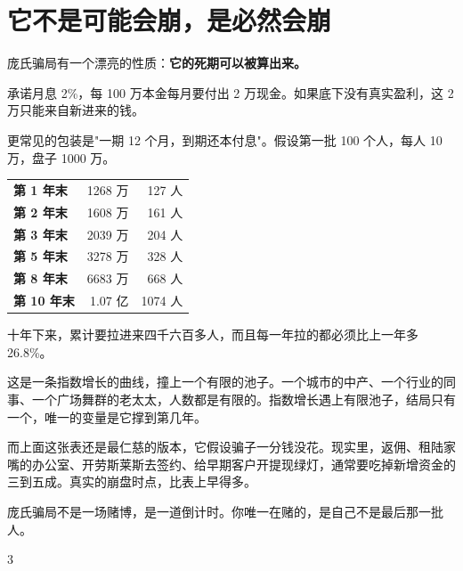 \section{它不是可能会崩，是必然会崩}

庞氏骗局有一个漂亮的性质：\textbf{它的死期可以被算出来。}

承诺月息 2\%，每 100 万本金每月要付出 2 万现金。如果底下没有真实盈利，这 2 万只能来自新进来的钱。

更常见的包装是"一期 12 个月，到期还本付息"。假设第一批 100 个人，每人 10 万，盘子 1000 万。

\begin{tablewrap}
\begin{xltabular}{\linewidth}{Xrr}
\toprule
{} &  &  \\
\midrule
\textbf{第 1 年末} & 1268 万 & 127 人 \\
\textbf{第 2 年末} & 1608 万 & 161 人 \\
\textbf{第 3 年末} & 2039 万 & 204 人 \\
\textbf{第 5 年末} & 3278 万 & 328 人 \\
\textbf{第 8 年末} & 6683 万 & 668 人 \\
\textbf{第 10 年末} & 1.07 亿 & 1074 人 \\
\bottomrule
\end{xltabular}
\end{tablewrap}

十年下来，累计要拉进来四千六百多人，而且每一年拉的都必须比上一年多 26.8\%。

这是一条指数增长的曲线，撞上一个有限的池子。一个城市的中产、一个行业的同事、一个广场舞群的老太太，人数都是有限的。指数增长遇上有限池子，结局只有一个，唯一的变量是它撑到第几年。

而上面这张表还是最仁慈的版本，它假设骗子一分钱没花。现实里，返佣、租陆家嘴的办公室、开劳斯莱斯去签约、给早期客户开提现绿灯，通常要吃掉新增资金的三到五成。真实的崩盘时点，比表上早得多。

\begin{pullquote}{}
庞氏骗局不是一场赌博，是一道倒计时。你唯一在赌的，是自己不是最后那一批人。
\end{pullquote}

\begin{statrow}{3}
\end{statrow}

